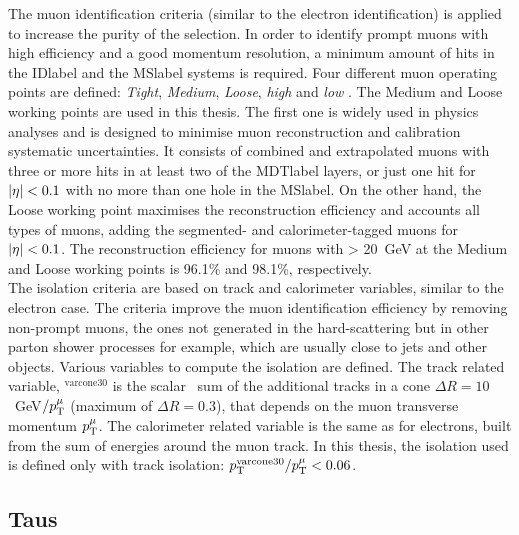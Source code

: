 The muon identification criteria (similar to the electron identification) is applied to increase the purity of the selection. In order to identify prompt muons with high efficiency and a good momentum resolution, a minimum amount of hits in the \acrshort{IDlabel} and the \acrshort{MSlabel} systems is required. Four different muon operating points are defined: \textit{Tight}, \textit{Medium}, \textit{Loose}, \textit{high \pT} and \textit{low \pT}. The Medium and Loose working points are used in this thesis. The first one is widely used in physics analyses and is designed to minimise muon reconstruction and calibration systematic uncertainties. It consists of combined and extrapolated muons with three or more hits in at least two of the \acrshort{MDTlabel} layers, or just one hit for $\abs{\eta}<0.1$ with no more than one hole in the \acrshort{MSlabel}. On the other hand, the Loose working point maximises the reconstruction efficiency and accounts all types of muons, adding the segmented- and calorimeter-tagged muons for $\abs{\eta}<0.1$. The reconstruction efficiency for muons with \pT > 20~GeV at the Medium and Loose working points is 96.1\% and 98.1\%, respectively. \\

The isolation criteria are based on track and calorimeter variables, similar to the electron case. The criteria improve the muon identification efficiency by removing non-prompt muons, the ones not generated in the hard-scattering but in other parton shower processes for example, which are usually close to jets and other objects. Various variables to compute the isolation are defined. The track related variable, \pT$^{\text{varcone30}}$ is the scalar \pT\ sum of the additional tracks in a cone $\Delta R=10$~GeV$/p_{\text{T}}^\mu$ (maximum of $\Delta R=0.3$), that depends on the muon transverse momentum $p_{\text{T}}^\mu$. The calorimeter related variable is the same as for electrons, built from the sum of energies around the muon track. In this thesis, the isolation used is defined only with track isolation: $p_{\text{T}}^\text{varcone30}/p_{\text{T}}^\mu<0.06$.       

\subsection{Taus}

